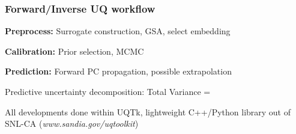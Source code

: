 \begin{frame}[t]
\label{sketch}
\vspace*{-0.3cm}

\footnotesize
\frametitle{Forward/Inverse UQ workflow}
\bi
\item \textbf{Preprocess:} Surrogate construction, GSA, select embedding
\item \textbf{Calibration:} Prior selection, MCMC
\item \textbf{Prediction:} Forward PC propagation, possible extrapolation
\ei



\footnotesize
\bi
\item Predictive uncertainty decomposition: Total Variance = \\
\medskip
{}
 \item All developments done within UQTk, lightweight C++/Python library out of SNL-CA (\emph{www.sandia.gov/uqtoolkit})
\ei

\end{frame}
